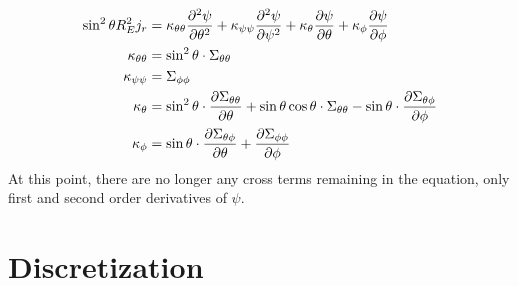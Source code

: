 \documentclass{article}
\begin{document}
\begin{subequations}
	\begin{align}
		\sin^2\theta R_E^2 j_r & = \kappa_{\theta\theta}\pdv[2]{\psi}{\theta} +
		\kappa_{\psi\psi} \pdv[2]{\psi}{\psi} +
		\kappa_{\theta} \pdv{\psi}{\theta} +
		\kappa_{\phi} \pdv{\psi}{\phi}                                                \\
		\kappa_{\theta\theta}  & = \sin^2 \theta \cdot  \Sigma_{\theta\theta}         \\
		\kappa_{\psi\psi}      & = \Sigma_{\phi\phi}                                  \\
		\kappa_{\theta}        & =
		\sin^2\theta\cdot \pdv{\Sigma_{\theta\theta}}{\theta}
		+ \sin \theta\cos\theta\cdot \Sigma_{\theta\theta}
		- \sin\theta\cdot\pdv{\Sigma_{\theta\phi}}{\phi}                              \\
		\kappa_{\phi}          & = \sin\theta\cdot\pdv{\Sigma_{\theta\phi}}{\theta} +
		\pdv{\Sigma_{\phi\phi}}{\phi}
	\end{align}
\end{subequations}
At this point, there are no longer any cross terms remaining in the equation, only first and second order derivatives of $\psi$.
\section{Discretization}
\end{document}
